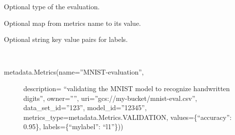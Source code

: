 \documentclass[letterpaper,10pt,english]{sphinxmanual}
\begin{document}
\begin{fulllineitems}
\begin{fulllineitems}
\end{fulllineitems}


\begin{fulllineitems}
\label{\detokenize{source/md:kubeflow.metadata.metadata.Metrics.metrics_type}}
Optional type of the evaluation.

\end{fulllineitems}


\begin{fulllineitems}
\label{\detokenize{source/md:kubeflow.metadata.metadata.Metrics.values}}
Optional map from metrics name to its value.

\end{fulllineitems}


\begin{fulllineitems}
\label{\detokenize{source/md:kubeflow.metadata.metadata.Metrics.labels}}
Optional string key value pairs for labels.

\end{fulllineitems}


\begin{fulllineitems}
\label{\detokenize{source/md:kubeflow.metadata.metadata.Metrics.example}}~\begin{description}
\item[{metadata.Metrics(name=”MNIST-evaluation”,}] \leavevmode
description=
“validating the MNIST model to recognize handwritten digits”,
owner=””,
uri=”gcs://my-bucket/mnist-eval.csv”,
data\_set\_id=”123”,
model\_id=”12345”,
metrics\_type=metadata.Metrics.VALIDATION,
values=\{“accuracy”: 0.95\},
labels=\{“mylabel”: “l1”\}))


\end{description}
\end{fulllineitems}
\end{fulllineitems}
\end{document}
